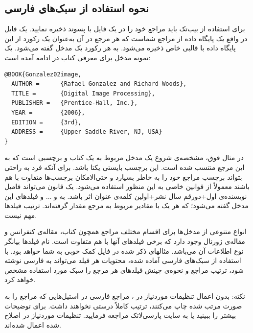 \subsection{ نحوه استفاده از سبک‌های فارسی}


برای استفاده از بیب‌تک باید مراجع خود را در یک فایل با پسوند  ذخیره نمایید. یک فایل  در واقع یک پایگاه داده از مراجع  شماست که هر مرجع در آن به‌عنوان یک رکورد از این پایگاه داده
با قالبی خاص ذخیره می‌شود. به هر رکورد یک مدخل گفته می‌شود. یک نمونه مدخل برای معرفی کتاب  در ادامه آمده است:

\singlespacing
\begin{LTR}
\begin{verbatim}
@BOOK{Gonzalez02image,
  AUTHOR =      {Rafael Gonzalez and Richard Woods},
  TITLE =       {Digital Image Processing},
  PUBLISHER =   {Prentice-Hall, Inc.},
  YEAR =        {2006},
  EDITION =     {3rd},
  ADDRESS =     {Upper Saddle River, NJ, USA}
}
\end{verbatim}
\end{LTR}
\doublespacing

در مثال فوق،  مشخصه‌ی شروع یک مدخل مربوط به یک کتاب و  برچسبی است که به این مرجع منتسب شده است.
 این برچسب بایستی یکتا باشد. برای آنکه فرد به راحتی بتواند برچسب مراجع خود را به خاطر بسپارد و حتی‌الامکان برچسب‌ها متفاوت با هم باشند معمولاً از قوانین خاصی به این منظور استفاده می‌شود. یک قانون می‌تواند فامیل نویسنده‌ی اول+دورقم سال نشر+اولین کلمه‌ی عنوان اثر باشد. به  و $\dots$ و  فیلدهای این مدخل گفته می‌شود؛ که هر یک با مقادیر مربوط به مرجع مقدار گرفته‌اند. ترتیب فیلدها مهم نیست. 

انواع متنوعی از مدخل‌ها برای اقسام مختلف مراجع همچون کتاب، مقاله‌ی کنفرانس و مقاله‌ی ژورنال وجود دارد که برخی فیلدهای آنها با هم متفاوت است. 
نام فیلدها بیانگر نوع اطلاعات آن می‌باشد. مثالهای ذکر شده در فایل  کمک خوبی به شما خواهد بود. 
با استفاده از سبک‌های فارسی آماده شده، محتویات هر فیلد می‌تواند به فارسی نوشته شود، ترتیب مراجع و نحوه‌ی چینش فیلدهای هر مرجع را سبک مورد استفاده  مشخص خواهد کرد.

نکته: بدون اعمال تنظیمات موردنیاز  در ، مراجع فارسی در استیل‌هایی که مراجع را به صورت مرتب شده چاپ می‌کنند، ترتیب کاملاً درستی نخواهند داشت. برای توضیحات بیشتر \cite{persianbib87userguide} را ببینید یا به سایت پارسی‌لاتک مراجعه فرمایید. تنظیمات موردنیاز در  اصلاح شده اعمال شده‌اند.

